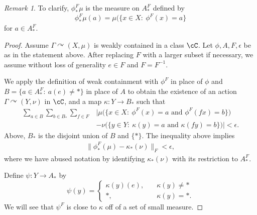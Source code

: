 \documentclass[12pt]{article}
\theoremstyle{plain}
\theoremstyle{definition}
\theoremstyle{remark}
\newtheorem{remark}{Remark}
\newcommand{\G}{\Gamma}
\newcommand{\eps}{\epsilon}
\def\cc{{\curvearrowright}}
\begin{document}
\begin{remark}
    To clarify, $\phi^F_*\mu$ is the measure on $A_*^F$ defined by
    $$\phi^F_*\mu(a) = \mu(\{x\in X:~\phi^F(x)=a\}$$  for $a\in A^F_*$. %
\end{remark}


\begin{proof} Assume $\G \cc (X,\mu)$ is weakly contained in a class $\cC$.    Let $\phi,A,F,\eps$ be as in the statement above. After replacing $F$ with a larger subset if necessary, we assume without loss of generality $e\in F$ and $F=F^{-1}$. 

We apply the definition of weak containment with $\phi^F$ in place of $\phi$ and $B=\{a\in A^F_*:~a(e) \ne *\}$ in place of $A$ to obtain the existence of an action $\G \cc (Y,\nu)$ in $\cC$, and a map $\kappa:Y\to B_*$ such that 
    \begin{align*}
    \sum_{a\in B} \sum_{b\in B_*} \sum_{f\in F}& \Big|\mu\big(\{x\in X:~ \phi^F(x)=a \textrm{ and } \phi^F(fx)=b\}\big)\\
    &- \nu\big(\{y\in Y:~ \kappa(y)=a \textrm{ and } \kappa(fy)=b\}\big)\Big|<\eps.
\end{align*}
Above, $B_*$ is the disjoint union of $B$ and $\{*\}$. The inequality above implies 
\begin{align}\label{E:part1}
\|\phi^F_*(\mu) - \kappa_*(\nu)\|_F < \eps,
\end{align}
where we have abused notation by identifying $\kappa_*(\nu)$ with its restriction to $A_*^F$. 

Define $\psi:Y \to A_*$ by 
\begin{displaymath}
    \psi(y) = \begin{cases}
        \kappa(y)(e), \quad & \kappa(y)\ne * \\
       *,  & \kappa(y)=*.
    \end{cases}
\end{displaymath}
We will see that $\psi^F$ is close to $\kappa$ off of a set of small measure.


\end{proof}
\end{document}
